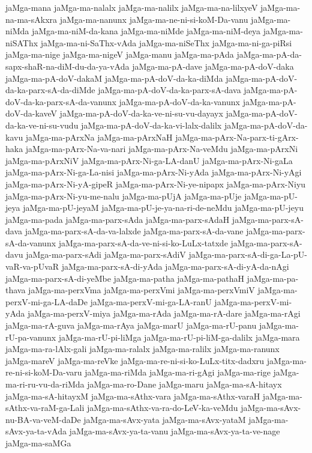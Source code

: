 {jaMga-mana
jaMga-ma-nalalx
jaMga-ma-nalilx
jaMga-ma-na-lilxyeV
jaMga-ma-na-ma-sAkxra
jaMga-ma-nanunx
jaMga-ma-ne-ni-si-koM-Da-vanu
jaMga-ma-niMda
jaMga-ma-niM-da-kana
jaMga-ma-niMde
jaMga-ma-niM-deya
jaMga-ma-niSAThx
jaMga-ma-ni-SaThx-vAda
jaMga-ma-niSeThx
jaMga-ma-ni-ga-piRsi
jaMga-ma-nige
jaMga-ma-nigeV
jaMga-manu
jaMga-ma-pAda
jaMga-ma-pA-da-sapx-shaR-na-diM-du-da-ya-vAda
jaMga-ma-pA-dave
jaMga-ma-pA-doV-daka
jaMga-ma-pA-doV-dakaM
jaMga-ma-pA-doV-da-ka-diMda
jaMga-ma-pA-doV-da-ka-parx-sA-da-diMde
jaMga-ma-pA-doV-da-ka-parx-sA-dava
jaMga-ma-pA-doV-da-ka-parx-sA-da-vanunx
jaMga-ma-pA-doV-da-ka-vanunx
jaMga-ma-pA-doV-da-kaveV
jaMga-ma-pA-doV-da-ka-ve-ni-su-vu-dayayx
jaMga-ma-pA-doV-da-ka-ve-ni-su-vudu
jaMga-ma-pA-doV-da-ka-vi-lalx-dalilx
jaMga-ma-pA-doV-da-kavu
jaMga-ma-pArxNa
jaMga-ma-pArxNaH
jaMga-ma-pArx-Na-parx-ti-gArx-haka
jaMga-ma-pArx-Na-va-nari
jaMga-ma-pArx-Na-veMdu
jaMga-ma-pArxNi
jaMga-ma-pArxNiV
jaMga-ma-pArx-Ni-ga-LA-danU
jaMga-ma-pArx-Ni-gaLa
jaMga-ma-pArx-Ni-ga-La-nisi
jaMga-ma-pArx-Ni-yAda
jaMga-ma-pArx-Ni-yAgi
jaMga-ma-pArx-Ni-yA-gipeR
jaMga-ma-pArx-Ni-ye-nipapx
jaMga-ma-pArx-Niyu
jaMga-ma-pArx-Ni-yu-me-nalu
jaMga-ma-pUjA
jaMga-ma-pUje
jaMga-ma-pU-jeya
jaMga-ma-pU-jeyaM
jaMga-ma-pU-je-ya-na-ri-de-neMdu
jaMga-ma-pU-jeyu
jaMga-ma-pada
jaMga-ma-parx-sAda
jaMga-ma-parx-sAdaH
jaMga-ma-parx-sA-dava
jaMga-ma-parx-sA-da-va-lalxde
jaMga-ma-parx-sA-da-vane
jaMga-ma-parx-sA-da-vanunx
jaMga-ma-parx-sA-da-ve-ni-si-ko-LuLx-tatxde
jaMga-ma-parx-sA-davu
jaMga-ma-parx-sAdi
jaMga-ma-parx-sAdiV
jaMga-ma-parx-sA-di-ga-La-pU-vaR-va-pUvaR
jaMga-ma-parx-sA-di-yAda
jaMga-ma-parx-sA-di-yA-da-nAgi
jaMga-ma-parx-sA-di-yeMbe
jaMga-ma-patha
jaMga-ma-pathaH
jaMga-ma-pa-thava
jaMga-ma-perxVma
jaMga-ma-perxVmi
jaMga-ma-perxVmiV
jaMga-ma-perxV-mi-ga-LA-daDe
jaMga-ma-perxV-mi-ga-LA-ranU
jaMga-ma-perxV-mi-yAda
jaMga-ma-perxV-miya
jaMga-ma-rAda
jaMga-ma-rA-dare
jaMga-ma-rAgi
jaMga-ma-rA-guva
jaMga-ma-rAya
jaMga-marU
jaMga-ma-rU-panu
jaMga-ma-rU-pa-vanunx
jaMga-ma-rU-pi-liMga
jaMga-ma-rU-pi-liM-ga-dalilx
jaMga-mara
jaMga-ma-ra-lAlx-gali
jaMga-ma-ralalx
jaMga-ma-ralilx
jaMga-ma-ranunx
jaMga-mareV
jaMga-ma-reVke
jaMga-ma-re-ni-si-ko-LuLx-titx-dadxru
jaMga-ma-re-ni-si-koM-Da-varu
jaMga-ma-riMda
jaMga-ma-ri-gAgi
jaMga-ma-rige
jaMga-ma-ri-ru-vu-da-riMda
jaMga-ma-ro-Dane
jaMga-maru
jaMga-ma-sA-hitayx
jaMga-ma-sA-hitayxM
jaMga-ma-sAthx-vara
jaMga-ma-sAthx-varaH
jaMga-ma-sAthx-va-raM-ga-Lali
jaMga-ma-sAthx-va-ra-do-LeV-ka-veMdu
jaMga-ma-sAvx-nu-BA-va-veM-daDe
jaMga-ma-sAvx-yata
jaMga-ma-sAvx-yataM
jaMga-ma-sAvx-ya-ta-vAda
jaMga-ma-sAvx-ya-ta-vanu
jaMga-ma-sAvx-ya-ta-ve-nage
jaMga-ma-saMGa
}
